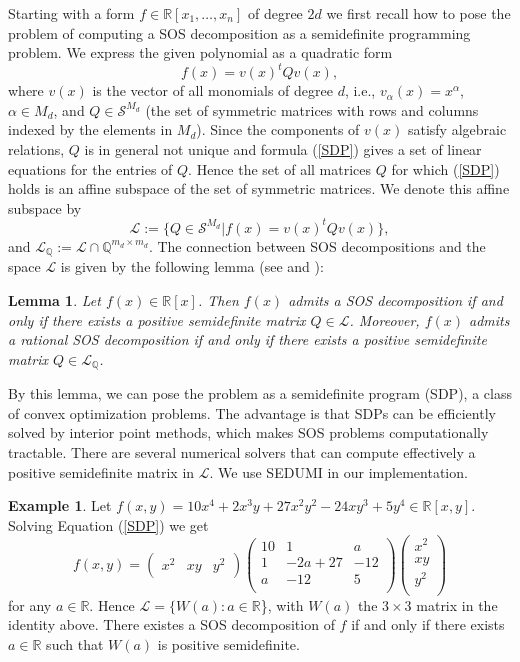 \documentclass{amsart}
\newtheorem{lemma}[theorem]{Lemma}
\theoremstyle{definition}
\newtheorem{example}[theorem]{Example}
\theoremstyle{remark}
\numberwithin{equation}{section}
\newcommand{\Sym}{{\mathcal S}}
\newcommand{\eLL}{{\mathcal L}}
\newcommand{\Q}{{\mathbb Q}}
\newcommand{\R}{{\mathbb R}}
\begin{document}
Starting with a form $f \in \R[x_1, \dots, x_n]$ of degree $2d$ we first recall how to pose the problem of computing a SOS decomposition as a semidefinite programming problem. We express the given polynomial as a quadratic form
\begin{equation}
\label{SDP}
f(x) = v(x)^t Q v(x),
\end{equation}
where $v(x)$ is the vector of all monomials of degree $d$, i.e., $v_\alpha(x) =x^\alpha$, $\alpha \in M_d$, and $Q \in \Sym^{M_d}$ (the set of symmetric matrices with rows and columns indexed by the elements in $M_d$).
Since the components of $v(x)$ satisfy algebraic relations, $Q$ is in general not unique and formula (\ref{SDP}) gives a set of linear equations for the entries of $Q$. Hence the set of all matrices $Q$ for which (\ref{SDP}) holds is an affine subspace of the set of symmetric matrices.
We denote this affine subspace by
\[
 \eLL := \{Q \in \Sym^{M_d} | f(x) = v(x)^t Q v(x)\},
\]
and $\eLL_\Q := \eLL \cap \Q^{m_d \times m_d}$.
The connection between SOS decompositions and the space $\eLL$ is given by the following lemma (see \cite[p.106]{choi2} and \cite{parrilo}):
\begin{lemma}
\label{SOS-SDP}
Let $f(x) \in \R[x]$. Then $f(x)$ admits a SOS decomposition if and only if there exists a positive semidefinite matrix $Q \in \eLL$.
Moreover, $f(x)$ admits a rational SOS decomposition if and only if there exists a positive semidefinite matrix $Q \in \eLL_\Q$.
\end{lemma}

By this lemma, we can pose the problem as a semidefinite program (SDP), a class of convex optimization problems. The advantage is that SDPs can be efficiently solved by interior point methods, which makes SOS problems computationally tractable. There are several numerical solvers that can compute effectively a positive semidefinite matrix in $\eLL$. We use SEDUMI \cite{SEDUMI} in our implementation.

\begin{example}
\label{example:3x3}
Let $f(x,y) = 10x^4+2x^3y+27x^2y^2-24xy^3+5y^4 \in \R[x,y]$. Solving Equation (\ref{SDP}) we get
\[
f(x,y)=
\begin{pmatrix}
x^2 & xy & y^2
\end{pmatrix}
\begin{pmatrix}
10 & 1 & a \\
1 & -2a + 27 & -12 \\
a & -12 & 5 \\
\end{pmatrix}
\begin{pmatrix}
x^2 \\
xy \\
y^2 \\
\end{pmatrix}
\]
for any $a \in \R$. Hence $\eLL = \{W(a) : a \in \R$\}, with $W(a)$ the $3 \times 3$ matrix in the identity above. There existes a SOS decomposition of $f$ if and only if there exists $a \in \R$ such that $W(a)$ is positive semidefinite.
\end{example}
\end{document}
